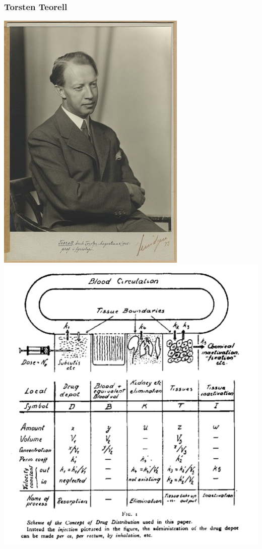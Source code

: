 \documentclass{beamer}
\begin{document}
\begin{frame}
  \frametitle{Torsten Teorell}

\begin{center}
\includegraphics[height=0.5\textheight]{graphics/teorell2.jpg}
\includegraphics[height=0.5\textheight]{graphics/teorellModel1.pdf}

\end{center}
\end{frame}
\end{document}
